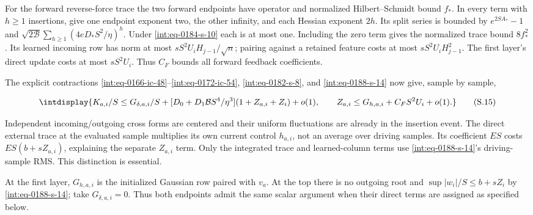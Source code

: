 
For the forward reverse-force trace the two forward endpoints have operator and normalized Hilbert--Schmidt bound \(f_*\). In every term with \(h\ge1\) insertions, give one endpoint exponent two, the other infinity, and each Hessian exponent \(2h\). Its split series is bounded by \(e^{2SA_*}-1\) and \(\sqrt{2\mathcal B}\sum_{h\ge1}(4eD_*S^2/\eta)^h\). Under \eqref{int:eq-0184-s-10} each is at most one. Including the zero term gives the normalized trace bound \(8f_*^2\). Its learned incoming row has norm at most \(sS^2U_iH_{j-1}/\sqrt n\); pairing against a retained feature costs at most \(sS^2U_iH_{j-1}^2\). The first layer's direct update costs at most \(sS^2U_i\). Thus \(C_F\) bounds all forward feedback coefficients.



The explicit contractions \eqref{int:eq-0166-ic-48}--\allowbreak \eqref{int:eq-0172-ic-54}, \eqref{int:eq-0182-s-8}, and \eqref{int:eq-0188-s-14} now give, sample by sample,


\begingroup\renewcommand{\theHequation}{intdisplay.385}
\begin{equation}
\intdisplay{
K_{a,i}/S\le G_{\delta,a,i}/S+
 [D_0+D_1\mathcal B S^4/\eta^3](1+Z_{a,i}+Z_i)+o(1),
\qquad
Z_{a,i}\le G_{h,a,i}+C_FS^2U_i+o(1).
}
\tag{S.15}
\label{int:eq-0189-s-15}
\end{equation}
\endgroup


Independent incoming/outgoing cross forms are centered and their uniform fluctuations are already in the insertion event. The direct external trace at the evaluated sample multiplies its own current control \(h_{a,\allowbreak i}\), not an average over driving samples. Its coefficient \(ES\) costs \(ES(b+sZ_{a,\allowbreak i})\), explaining the separate \(Z_{a,\allowbreak i}\) term. Only the integrated trace and learned-column terms use \eqref{int:eq-0188-s-14}'s driving-sample RMS. This distinction is essential.



At the first layer, \(G_{h,\allowbreak a,\allowbreak i}\) is the initialized Gaussian row paired with \(v_a\). At the top there is no outgoing root and \(\sup|w_i|/S\le b+sZ_i\) by \eqref{int:eq-0188-s-14}; take \(G_{\delta,\allowbreak a,\allowbreak i}=0\). Thus both endpoints admit the same scalar argument when their direct terms are assigned as specified below.


